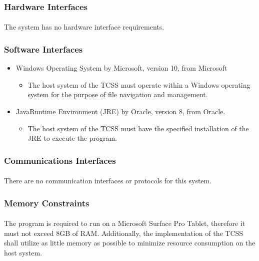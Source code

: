 \documentclass{article}
\begin{document}
    \subsubsection{Hardware Interfaces}
    \paragraph{}
    The system has no hardware interface  requirements.

    \subsubsection{Software Interfaces}
    \begin{itemize}
        \item Windows Operating System\textregistered\; by Microsoft\textregistered, version 10, from Microsoft\textregistered
        \begin{itemize}
            \item The host system of the TCSS must operate within a Windows operating system for the purpose of file navigation and management.
        \end{itemize}
        \item Java\texttrademark \;Runtime Environment (JRE) by Oracle\textregistered, version 8, from Oracle\textregistered.
        \begin{itemize}
            \item The host system of the TCSS must have the specified installation of the JRE to execute the program.
        \end{itemize}
    \end{itemize}
    
    \subsubsection{Communications Interfaces}
    \paragraph{}
    There are no communication interfaces or protocols for this system.

    \subsubsection{Memory Constraints}
    \paragraph{}
    The program is required to run on a Microsoft Surface Pro Tablet, therefore it must not exceed 8GB of RAM. Additionally, the implementation of the TCSS shall utilize as little memory as possible to minimize resource consumption on the host system.
\end{document}
